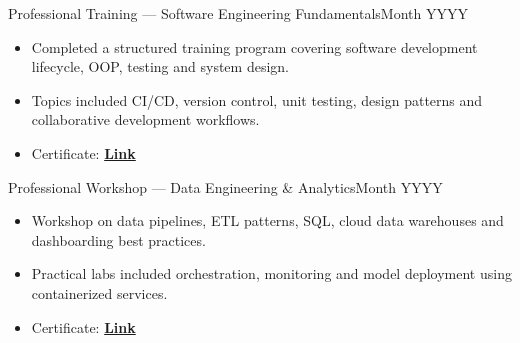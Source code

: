   \customSubHeadingContentStart

    \customSubHeading
      {Professional Training — Software Engineering Fundamentals}{Month YYYY}
      \begin{itemize}[itemsep=-3pt, left=0pt]
        \item{Completed a structured training program covering software development lifecycle, OOP, testing and system design.}
        \item{Topics included CI/CD, version control, unit testing, design patterns and collaborative development workflows.}
        \item{Certificate: \textbf{{\href{https://www.example.com/certificate}{Link}}} }
    \end{itemize}
    \vspace{-10pt}
      
    \customSubHeading
      {Professional Workshop — Data Engineering \& Analytics}{Month YYYY}
     \begin{itemize}[itemsep=-3pt, left=0pt]
        \item{Workshop on data pipelines, ETL patterns, SQL, cloud data warehouses and dashboarding best practices.}
        \item{Practical labs included orchestration, monitoring and model deployment using containerized services.}
        \item{Certificate: \textbf{{\href{https://www.example.com/certificate}{Link}}} }
    \end{itemize}
    \vspace{-10pt}

  \customSubHeadingContentEnd
\vspace{-6pt}